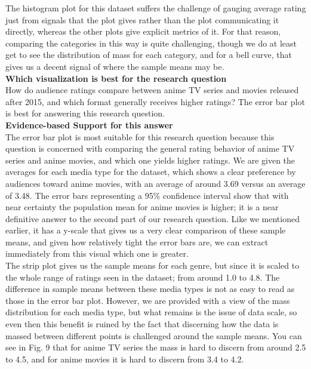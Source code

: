 The histogram plot for this dataset suffers the challenge of gauging average rating just from signals that the plot gives rather than the plot communicating it directly, whereas the other plots give explicit metrics of it. For that reason, comparing the categories in this way is quite challenging, though we do at least get to see the distribution of mass for each category, and for a bell curve, that gives us a decent signal of where the sample means may be.\\

\textbf{Which visualization is best for the research question}\\

How do audience ratings compare between anime TV series and movies released after 2015, and which format generally receives higher ratings? The error bar plot is best for answering this research question.\\

\textbf{Evidence-based Support for this answer}\\
The error bar plot is most suitable for this research question because this question is concerned with comparing the general rating behavior of anime TV series and anime movies, and which one yields higher ratings. We are given the averages for each media type for the dataset, which shows a clear preference by audiences toward anime movies, with an average of around 3.69 versus an average of 3.48. The error bars representing a 95\% confidence interval show that with near certainty the population mean for anime movies is higher; it is a near definitive answer to the second part of our research question. Like we mentioned earlier, it has a y-scale that gives us a very clear comparison of these sample means, and given how relatively tight the error bars are, we can extract immediately from this visual which one is greater.\\

The strip plot gives us the sample means for each genre, but since it is scaled to the whole range of ratings seen in the dataset; from around 1.0 to 4.8. The difference in sample means between these media types is not as easy to read as those in the error bar plot. However, we are provided with a view of the mass distribution for each media type, but what remains is the issue of data scale, so even then this benefit is ruined by the fact that discerning how the data is massed between different points is challenged around the sample means. You can see in Fig. 9 that for anime TV series the mass is hard to discern from around 2.5 to 4.5, and for anime movies it is hard to discern from 3.4 to 4.2.\\

